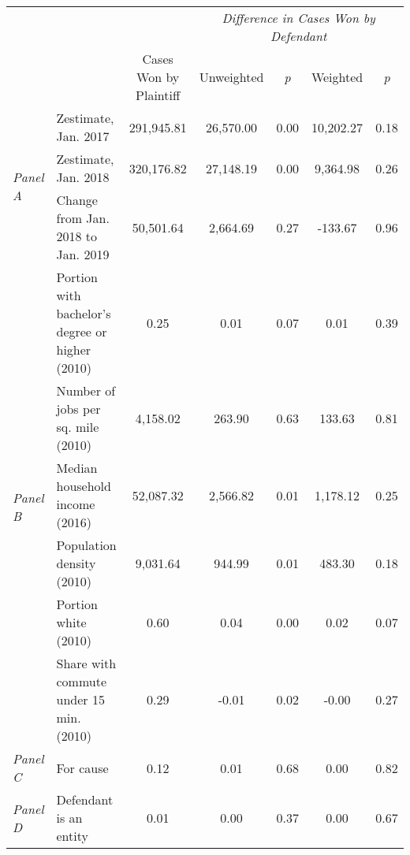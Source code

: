 \begin{tabular}{llccccc}
\toprule
 &  & \textit{} & \multicolumn{4}{c}{\textit{Difference in Cases Won by Defendant}} \\
 &  & Cases Won by Plaintiff & Unweighted & \emph{p} & Weighted & \emph{p} \\
\midrule
\multirow[c]{3}{3cm}{\textit{Panel A}} & Zestimate, Jan. 2017 & 291,945.81 & 26,570.00 & 0.00 & 10,202.27 & 0.18 \\
 & Zestimate, Jan. 2018 & 320,176.82 & 27,148.19 & 0.00 & 9,364.98 & 0.26 \\
 & Change from Jan. 2018 to Jan. 2019 & 50,501.64 & 2,664.69 & 0.27 & -133.67 & 0.96 \\
\cline{1-7}
\multirow[c]{6}{3cm}{\textit{Panel B}} & Portion with bachelor's degree or higher (2010) & 0.25 & 0.01 & 0.07 & 0.01 & 0.39 \\
 & Number of jobs per sq. mile (2010) & 4,158.02 & 263.90 & 0.63 & 133.63 & 0.81 \\
 & Median household income (2016) & 52,087.32 & 2,566.82 & 0.01 & 1,178.12 & 0.25 \\
 & Population density (2010) & 9,031.64 & 944.99 & 0.01 & 483.30 & 0.18 \\
 & Portion white (2010) & 0.60 & 0.04 & 0.00 & 0.02 & 0.07 \\
 & Share with commute under 15 min. (2010) & 0.29 & -0.01 & 0.02 & -0.00 & 0.27 \\
\cline{1-7}
\textit{Panel C} & For cause & 0.12 & 0.01 & 0.68 & 0.00 & 0.82 \\
\cline{1-7}
\textit{Panel D} & Defendant is an entity & 0.01 & 0.00 & 0.37 & 0.00 & 0.67 \\
\cline{1-7}
\bottomrule
\end{tabular}
